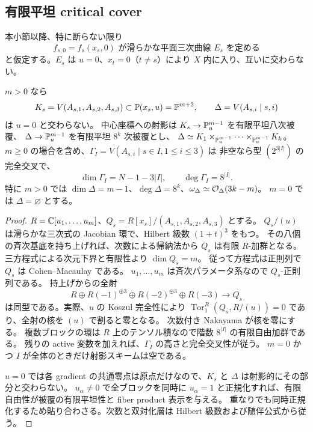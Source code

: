 \subsection{有限平坦 critical cover}
本小節以降、特に断らない限り
\begin{equation}
f_{s,0}=f_s(x_s,0)\text{ が滑らかな平面三次曲線 }E_s\text{ を定める}\label{eq:pg-smooth-block}
\end{equation}
と仮定する。$E_s$ は $u=0$、$x_t=0$（$t\neq s$）により $X$ 内に入り、互いに交わらない。
\begin{lemma}\label{lem:pg-critical-cover}
$m>0$ なら
\begin{equation}
K_s=V(A_{s,1},A_{s,2},A_{s,3})\subset\mathbb P(x_s,u)=\mathbb P^{m+2},
\qquad\Delta=V(A_{s,i}\mid s,i)
\end{equation}
は $u=0$ と交わらない。
中心座標への射影は $K_s\to\mathbb P_u^{m-1}$ を有限平坦八次被覆、
$\Delta\to\mathbb P_u^{m-1}$ を有限平坦 $8^k$ 次被覆とし、
$\Delta\simeq K_1\times_{\mathbb P_u^{m-1}}\cdots\times_{\mathbb P_u^{m-1}}K_k$。
$m\geq0$ の場合を含め、$\Gamma_I=V(A_{s,i}\mid s\in I,1\leq i\leq3)$ は
非空なら型 $(2^{3|I|})$ の完全交叉で、
\begin{equation}
\dim\Gamma_I=N-1-3|I|,\qquad\deg\Gamma_I=8^{|I|}.
\end{equation}
特に $m>0$ では
$\dim\Delta=m-1$、$\deg\Delta=8^k$、$\omega_\Delta\simeq\mathcal O_\Delta(3k-m)$。
$m=0$ では $\Delta=\varnothing$ とする。
\end{lemma}
\begin{proof}
$R=\mathbb C[u_1,\ldots,u_m]$、$Q_s=R[x_s]/(A_{s,1},A_{s,2},A_{s,3})$ とする。
$Q_s/(u)$ は滑らかな三次式の Jacobian 環で、Hilbert 級数 $(1+t)^3$ をもつ。
その八個の斉次基底を持ち上げれば、次数による帰納法から $Q_s$ は有限 $R$-加群となる。
三方程式による次元下界と有限性より $\dim Q_s=m$。
従って方程式は正則列で $Q_s$ は Cohen--Macaulay である。
$u_1,\ldots,u_m$ は斉次パラメータ系なので $Q_s$-正則列である。
持上げからの全射
\begin{equation}
R\oplus R(-1)^{\oplus3}\oplus R(-2)^{\oplus3}\oplus R(-3)\longrightarrow Q_s
\end{equation}
は同型である。実際、$u$ の Koszul 完全性により
$\operatorname{Tor}_1^R(Q_s,R/(u))=0$ であり、全射の核を $(u)$ で割ると零となる。
次数付き Nakayama が核を零にする。
複数ブロックの環は $R$ 上のテンソル積なので階数 $8^{|I|}$ の有限自由加群である。
残りの active 変数を加えれば、$\Gamma_I$ の高さと完全交叉性が従う。
$m=0$ かつ $I$ が全体のときだけ射影スキームは空である。

$u=0$ では各 gradient の共通零点は原点だけなので、$K_s$ と $\Delta$ は射影的にその部分と交わらない。
$u_\alpha\neq0$ で全ブロックを同時に $u_\alpha=1$ と正規化すれば、有限自由性が被覆の有限平坦性と fiber product 表示を与える。
重なりでも同時正規化するため貼り合わさる。次数と双対化層は Hilbert 級数および随伴公式から従う。
\end{proof}

